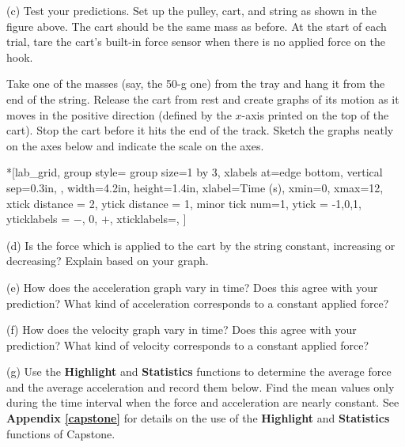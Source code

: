 (c) Test your predictions. Set up the pulley, cart, and string as shown in the figure above. 
The cart should be the same mass as before. At the start of each trial, tare the cart's built-in force sensor when there is no applied force on the hook.  

Take one of the masses (say, the 50-g one) from the tray and hang it from the end of the string.  Release the cart from rest and create graphs of its motion as it moves in the positive direction (defined by the $x$-axis printed on the top of the cart). Stop the cart before it hits the end of the track. Sketch the graphs neatly on the axes below and indicate the scale on the axes.

\begin{lab_groupplot}*{}[lab_grid,
	group style={
		group size=1 by 3,
		xlabels at=edge bottom,
		vertical sep=0.3in,
		},
	width=4.2in,  height=1.4in,
	xlabel=Time (s),
	xmin=0, xmax=12,
	xtick distance = 2, 
	ytick distance = 1, 
	minor tick num=1,
	ytick = {-1,0,1},
	yticklabels = {$-$, 0, $+$},
	xticklabels=\empty,
	]
\nextgroupplot[
	ymin=-1,ymax=1, 
	ylabel={Velocity (m/s)},
	]
\nextgroupplot[
	ymin=-1,ymax=1, 
	ylabel={Acceleration (m/s$^2$)},
	]
\nextgroupplot[
	ymin=-1,ymax=1, 
	ylabel={Force (N)},
	]
\end{lab_groupplot} 

(d) Is the force which is applied to the cart by the string constant, increasing
or decreasing? Explain based on your graph.
\answerspace{15mm}

\pagebreak[2]
(e) How does the acceleration graph vary in time? Does this agree with your
prediction? What kind of acceleration corresponds to a constant applied force?
\answerspace{20mm}

(f) How does the velocity graph vary in time? Does this agree with your prediction?
What kind of velocity corresponds to a constant applied force?
\answerspace{20mm}

(g) Use the \textbf{Highlight} and \textbf{Statistics} functions to determine 
the average force and the average acceleration and record them below. Find the mean values only during the time interval when the force and acceleration are nearly constant. See \textbf{Appendix \ref{capstone}} for details on the use of the \textbf{Highlight} and  \textbf{Statistics} functions of Capstone.
\answerspace{20mm}

